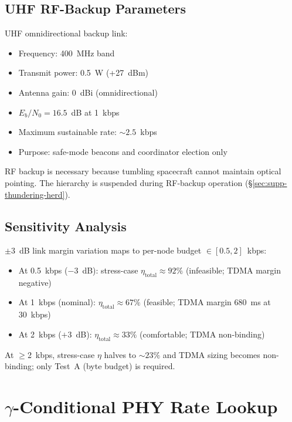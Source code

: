 \documentclass[journal]{IEEEtran}
\begin{document}
\subsection{UHF RF-Backup Parameters}

UHF omnidirectional backup link:
\begin{itemize}
    \item Frequency: 400~MHz band
    \item Transmit power: 0.5~W (+27~dBm)
    \item Antenna gain: 0~dBi (omnidirectional)
    \item $E_b/N_0 = 16.5$~dB at 1~kbps
    \item Maximum sustainable rate: ${\sim}2.5$~kbps
    \item Purpose: safe-mode beacons and coordinator election only
\end{itemize}

RF backup is necessary because tumbling spacecraft cannot maintain optical pointing. The hierarchy is suspended during RF-backup operation (\S\ref{sec:supp-thundering-herd}).

\subsection{Sensitivity Analysis}

$\pm 3$~dB link margin variation maps to per-node budget $\in [0.5, 2]$~kbps:
\begin{itemize}
    \item At 0.5~kbps ($-3$~dB): stress-case $\eta_{\text{total}} \approx 92\%$ (infeasible; TDMA margin negative)
    \item At 1~kbps (nominal): $\eta_{\text{total}} \approx 67\%$ (feasible; TDMA margin 680~ms at 30~kbps)
    \item At 2~kbps ($+3$~dB): $\eta_{\text{total}} \approx 33\%$ (comfortable; TDMA non-binding)
\end{itemize}

At $\geq$2~kbps, stress-case $\eta$ halves to ${\sim}23\%$ and TDMA sizing becomes non-binding; only Test~A (byte budget) is required.


\section{$\gamma$-Conditional PHY Rate Lookup}
\label{sec:supp-gamma-lookup}
\end{document}
